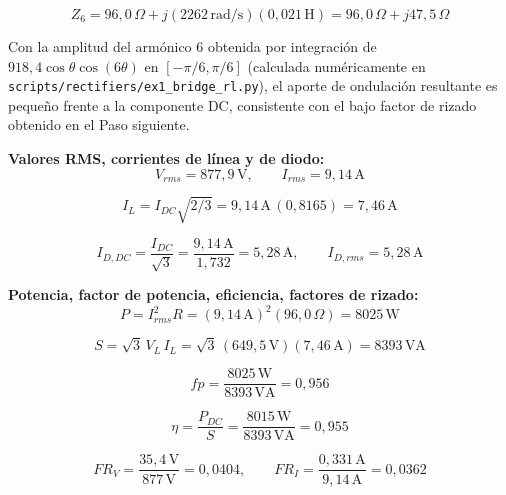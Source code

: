 \documentclass[12pt,a4paper]{article}
\begin{document}
\begin{equation}
    Z_6 = 96{,}0\,\Omega + j(2262\,\text{rad/s})(0{,}021\,\text{H}) = 96{,}0\,\Omega + j47{,}5\,\Omega
\end{equation}

Con la amplitud del armónico 6 obtenida por integración de $918{,}4\cos\theta\cos(6\theta)$
en $[-\pi/6,\pi/6]$ (calculada numéricamente en \texttt{scripts/rectifiers/ex1\_bridge\_rl.py}),
el aporte de ondulación resultante es pequeño frente a la componente DC, consistente
con el bajo factor de rizado obtenido en el Paso siguiente.

\textbf{Valores RMS, corrientes de línea y de diodo:}
\begin{equation}
    V_{rms} = \boxed{877{,}9\,\text{V}}, \qquad I_{rms} = \boxed{9{,}14\,\text{A}}
\end{equation}

\begin{equation}
    I_L = I_{DC}\sqrt{2/3} = 9{,}14\,\text{A}\,(0{,}8165) = \boxed{7{,}46\,\text{A}}
\end{equation}

\begin{equation}
    I_{D,DC} = \frac{I_{DC}}{\sqrt3} = \frac{9{,}14\,\text{A}}{1{,}732} = \boxed{5{,}28\,\text{A}},
    \qquad I_{D,rms} = \boxed{5{,}28\,\text{A}}
\end{equation}

\textbf{Potencia, factor de potencia, eficiencia, factores de rizado:}
\begin{equation}
    P = I_{rms}^2 R = (9{,}14\,\text{A})^2(96{,}0\,\Omega) = \boxed{8025\,\text{W}}
\end{equation}

\begin{equation}
    S = \sqrt3\,V_L\,I_L = \sqrt3\,(649{,}5\,\text{V})(7{,}46\,\text{A}) = \boxed{8393\,\text{VA}}
\end{equation}

\begin{equation}
    fp = \frac{8025\,\text{W}}{8393\,\text{VA}} = \boxed{0{,}956}
\end{equation}

\begin{equation}
    \eta = \frac{P_{DC}}{S} = \frac{8015\,\text{W}}{8393\,\text{VA}} = \boxed{0{,}955}
\end{equation}

\begin{equation}
    FR_V = \frac{35{,}4\,\text{V}}{877\,\text{V}} = \boxed{0{,}0404}, \qquad
    FR_I = \frac{0{,}331\,\text{A}}{9{,}14\,\text{A}} = \boxed{0{,}0362}
\end{equation}
\end{document}
